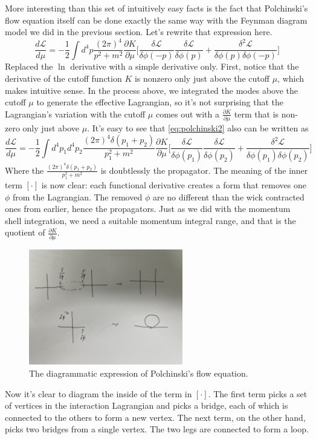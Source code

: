 \documentclass[12pt,halfline,a4paper]{ouparticle}
\begin{document}
More interesting than this set of intuitively easy facts is the fact that Polchinski's flow equation itself can be done exactly the same way with the Feynman diagram model we did in the previous section. Let's rewrite that expression here. 
\begin{equation}
	\label{eq:polchinski2}
	\frac{d\mathcal L}{d\mu}=-\frac{1}{2}\int d^4p\frac{(2\pi)^4}{p^2+m^2}\frac{\partial K}{\partial\mu}\bigg[\frac{\delta \mathcal L}{\delta \phi(-p)}\frac{\delta \mathcal L}{\delta \phi(p)}+\frac{\delta^2 \mathcal L}{\delta \phi(p)\delta \phi(-p)}\bigg]
\end{equation}
Replaced the $\ln$ derivative with a simple derivative only. First, notice that the derivative of the cutoff function $K$ is nonzero only just above the cutoff $\mu$, which makes intuitive sense. In the process above, we integrated the modes above the cutoff $\mu$ to generate the effective Lagrangian, so it's not surprising that the Lagrangian's variation with the cutoff $\mu$ comes out with a $\frac{\partial K}{\partial \mu}$ term that is non-zero only just above $\mu$.
It's easy to see that \ref{eq:polchinski2} also can be written as
\begin{equation}
	\frac{d\mathcal L}{d\mu}=-\frac{1}{2}\int d^4p_1d^4p_2\frac{(2\pi)^4\delta(p_1+p_2)}{p_1^2+m^2}\frac{\partial K}{\partial\mu}\bigg[\frac{\delta \mathcal L}{\delta \phi(p_1)}\frac{\delta \mathcal L}{\delta \phi(p_2)}+\frac{\delta^2 \mathcal L}{\delta \phi(p_1)\delta \phi(p_2)}\bigg]
\end{equation}
Where the $\frac{(2\pi)^4\delta(p_1+p_2)}{p_1^2+m^2}$ is doubtlessly the propagator. 
The meaning of the inner term $[\cdot]$ is now clear: each functional derivative creates a form that removes one $\phi$ from the Lagrangian. The removed $\phi$ are no different than the wick contracted ones from earlier, hence the propagators. Just as we did with the momentum shell integration, we need a suitable momentum integral range, and that is the quotient of $\frac{\partial K}{\partial \mu}$.
\begin{figure}[h!]
	\centering
	\includegraphics[width=0.6\textwidth]{Fig5.jpeg}
	\caption{The diagrammatic expression of Polchinski's flow equation.}
	\label{fig:polchinski}
\end{figure}
Now it's clear to diagram the inside of the term in $[\cdot]$. The first term picks a set of vertices in the interaction Lagrangian and picks a bridge, each of which is connected to the others to form a new vertex. The next term, on the other hand, picks two bridges from a single vertex. The two legs are connected to form a loop.
\end{document}
